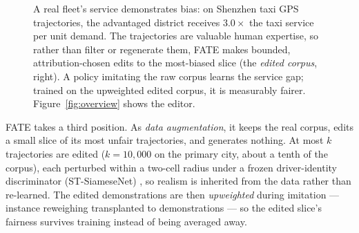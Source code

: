 \begin{figure}[t]
  \centering
%   
  
  \caption{
  A real fleet's service demonstrates bias: on Shenzhen taxi GPS
  trajectories, the advantaged district receives $3.0\times$ the taxi
  service per unit demand.
  The trajectories are valuable human expertise, so rather than filter or
  regenerate them, FATE makes bounded, attribution-chosen edits to the
  most-biased slice (the \emph{edited corpus}, right).
  A policy imitating the raw corpus learns the service gap; trained on the
  upweighted edited corpus, it is measurably fairer.
  Figure~\ref{fig:overview} shows the editor.}
  \label{fig:teaser}
\end{figure}

FATE takes a third position. As \emph{data augmentation}, it keeps the real
corpus, edits a small slice of its most unfair trajectories, and generates
nothing. At most $k$ trajectories are edited ($k = 10{,}000$ on the primary
city, about a tenth of the corpus), each perturbed within a two-cell radius
under a frozen driver-identity discriminator (ST-SiameseNet)
\cite{ren2020stsiamese}, so realism is inherited from the data rather than
re-learned. The edited demonstrations are then \emph{upweighted} during
imitation --- instance reweighing \cite{kamirancalders2012} transplanted to
demonstrations --- so the edited slice's fairness survives training instead
of being averaged away.

